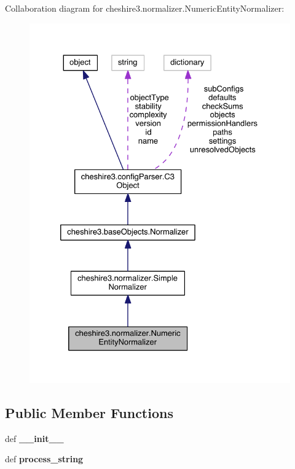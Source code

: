 Collaboration diagram for cheshire3.\-normalizer.\-Numeric\-Entity\-Normalizer\-:
\nopagebreak
\begin{figure}[H]
\begin{center}
\leavevmode
\includegraphics[width=328pt]{classcheshire3_1_1normalizer_1_1_numeric_entity_normalizer__coll__graph}
\end{center}
\end{figure}
\subsection*{Public Member Functions}
\begin{DoxyCompactItemize}
\item 
\hypertarget{classcheshire3_1_1normalizer_1_1_numeric_entity_normalizer_a93688b7ac2629cb9079216bfadb09f9d}{def {\bfseries \-\_\-\-\_\-init\-\_\-\-\_\-}}\label{classcheshire3_1_1normalizer_1_1_numeric_entity_normalizer_a93688b7ac2629cb9079216bfadb09f9d}

\item 
\hypertarget{classcheshire3_1_1normalizer_1_1_numeric_entity_normalizer_a3c2fa0bb19db4f2086228f0d6d586bca}{def {\bfseries process\-\_\-string}}\label{classcheshire3_1_1normalizer_1_1_numeric_entity_normalizer_a3c2fa0bb19db4f2086228f0d6d586bca}

\end{DoxyCompactItemize}
